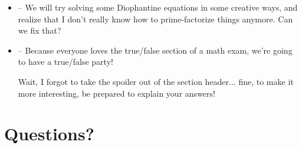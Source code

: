 \documentclass[12pt]{article}
\begin{document}
\begin{itemize}
  \item {} -- We will try solving some Diophantine equations in some
    creative ways, and realize that I don't really know how to prime-factorize
    things anymore. Can we fix that? 

  \item {} -- Because everyone loves the true/false section of a math 
    exam, we're going to have a true/false party!

    Wait, I forgot to take the spoiler out of the section header... fine, to
    make it more interesting, be prepared to explain your answers!
\end{itemize}


\section*{Questions?}
\end{document}
